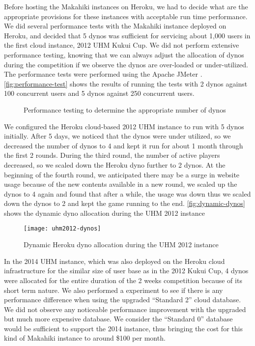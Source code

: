 Before hosting the Makahiki instances on Heroku, we had to decide what are the appropriate provisions for these instances with acceptable run time performance. 
We did several performance tests with the Makahiki instance deployed on Heroku, and decided that 5 dynos was sufficient for servicing about 1,000 users in the first cloud instance, 2012 UHM Kukui Cup. We did not perform extensive performance testing, knowing that we can always adjust the allocation of dynos during the competition if we observe the dynos are over-loaded or under-utilized. The performance tests were performed using the Apache JMeter \cite{jmeter}. \autoref{fig:performance-test} shows the results of running the tests with 2 dynos against 100 concurrent users and 5 dynos against 250 concurrent users.

\begin{figure}[ht!]
	\centering
		\caption{Performance testing to determine the appropriate number of dynos}
		\label{fig:performance-test}
\end{figure}

We configured the Heroku cloud-based 2012 UHM instance to run with 5 dynos initially. After 5 days, we noticed that the dynos were under utilized, so we decreased the number of dynos to 4 and kept it run for about 1 month through the first 2 rounds. During the third round, the number of active players decreased, so we scaled down the Heroku dyno further to 2 dynos. At the beginning of the fourth round, we anticipated there may be a surge in website usage because of the new contents available in a new round, we scaled up the dynos to 4 again and found that after a while, the usage was down thus we scaled down the dynos to 2 and kept the game running to the end. \autoref{fig:dynamic-dynos} shows the dynamic dyno allocation during the UHM 2012 instance

\begin{figure}[ht!]
  \center
  \texttt{[image: uhm2012-dynos]}
  \caption{Dynamic Heroku dyno allocation during the UHM 2012 instance}
  \label{fig:dynamic-dynos}
\end{figure}

In the 2014 UHM instance, which was also deployed on the Heroku cloud infrastructure for the similar size of user base as in the 2012 Kukui Cup, 4 dynos were allocated for the entire duration of the 2 weeks competition because of its short term nature. We also performed a experiment to see if there is any performance difference when using the upgraded ``Standard 2'' cloud database. We did not observe any noticeable performance improvement with the upgraded but much more expensive database. We consider the ``Standard 0'' database would be sufficient to support the 2014 instance, thus bringing the cost for this kind of Makahiki instance to around \$100 per month.

